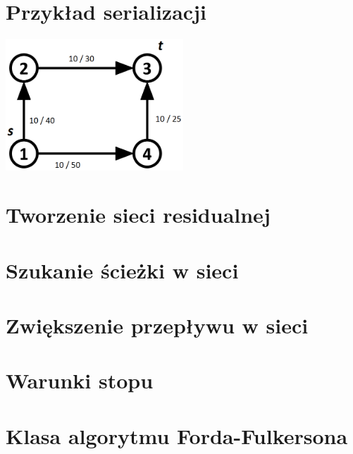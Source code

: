 \begin{appendices}
 	\chapter{Przykład serializacji}\label{add:A}
 	\begin{center}
 		\includegraphics[width=0.5\textwidth]{./img/serialized_graph.png}
 	\end{center}
 	
 	\vfill
 	
 	\vfill
 	\chapter{Tworzenie sieci residualnej}\label{add:B}
 	\vspace{-1cm}
 	\chapter{Szukanie ścieżki w sieci}
 	\label{add:findPathAlg}
 	\chapter{Zwiększenie przepływu w sieci}
 	\label{add:increaseFlowAlg}
 	\chapter{Warunki stopu}\label{add:stopConditionsAlg}
 	\vfill
 	\chapter{Klasa algorytmu Forda-Fulkersona}\label{add:fordFulkersonAlg}

\end{appendices}
